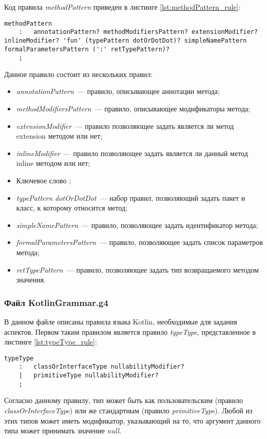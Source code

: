 Код правила \textit{methodPattern} приведен в листинге \ref{lst:methodPattern_rule}:
\begin{lstlisting}[style={java}, label={lst:methodPattern_rule},
  caption={Правило methodPattern}]
methodPattern
	:	annotationPattern? methodModifiersPattern? extensionModifier? inlineModifier? 'fun' (typePattern dotOrDotDot)? simpleNamePattern formalParametersPattern (':' retTypePattern)?
	;
\end{lstlisting}
Данное правило состоит из нескольких правил:
\begin{itemize}
	\item \textit{annotationPattern}~--- правило, описывающее аннотации метода;
	\item \textit{methodModifiersPattern}~--- правило, описывающее модификаторы метода;
	\item \textit{extensionModifier}~--- правило позволяющее задать является ли метод extension методом или нет;
	\item \textit{inlineModifier}~--- правило позволяющее задать является ли данный метод inline методом или нет;
	\item Ключевое слово ;
	\item \textit{typePattern dotOrDotDot}~--- набор правил, позволяющий задать пакет и класс, к которому относится метод;
	\item \textit{simpleNamePattern}~--- правило, позволяющее задать идентификатор метода;
	\item \textit{formalParametersPattern}~--- правило, позволяющее задать список параметров метода;
	\item \textit{retTypePattern}~--- правило, позволяющее задать тип возвращаемого методом значения.
\end{itemize}
\subsubsection{Файл KotlinGrammar.g4}
\label{ssub:kotlin_grammar_g4}
В данном файле описаны правила языка Kotlin, необходимые для задания аспектов.
Первом таким правилом является правило \textit{typeType}, представленное в листинге \ref{lst:typeType_rule}:
\begin{lstlisting}[style={java}, label={lst:typeType_rule},
  caption={Правило typeType}]
typeType
    :   classOrInterfaceType nullabilityModifier?
    |   primitiveType nullabilityModifier?
    ;
\end{lstlisting}
Согласно данному правилу, тип может быть как пользовательским (правило \textit{classOrInterfaceType}) или же стандартным (правило \textit{primitiveType}).
Любой из этих типов может иметь модификатор, указывающий на то, что аргумент данного типа может принимать значение \textit{null}.

